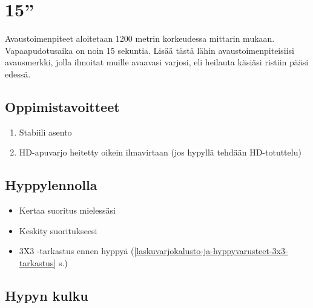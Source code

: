 \section{ 15'' }
\label{pl-peruskoulutuksen-suoritukset-15}


Avaustoimenpiteet aloitetaan 1200 metrin korkeudessa mittarin mukaan. Vapaapudotusaika on noin 15 sekuntia. Lisää tästä lähin avaustoimenpiteisiisi avausmerkki, jolla ilmoitat muille avaavasi varjosi, eli heilauta käsiäsi ristiin pääsi edessä.  

\subsection{ Oppimistavoitteet }
\label{pl-peruskoulutuksen-suoritukset-oppimistavoitteet}

\begin{enumerate}[label=\bfseries \arabic*)]
\item  Stabiili asento  
\item  HD-apuvarjo heitetty oikein ilmavirtaan (jos hypyllä tehdään HD-totuttelu) 
\end{enumerate}
\subsection{ Hyppylennolla }
\label{pl-peruskoulutuksen-suoritukset-hyppylennolla}

\begin{itemize}
\item Kertaa suoritus mielessäsi 
\item Keskity suoritukseesi 
\item 3X3 -tarkastus ennen hyppyä (\ref{laskuvarjokalusto-ja-hyppyvarusteet-3x3-tarkastus} s.\pageref{laskuvarjokalusto-ja-hyppyvarusteet-3x3-tarkastus}) 
\end{itemize}
\subsection{ Hypyn kulku }
\label{pl-peruskoulutuksen-suoritukset-hypyn-kulku}


